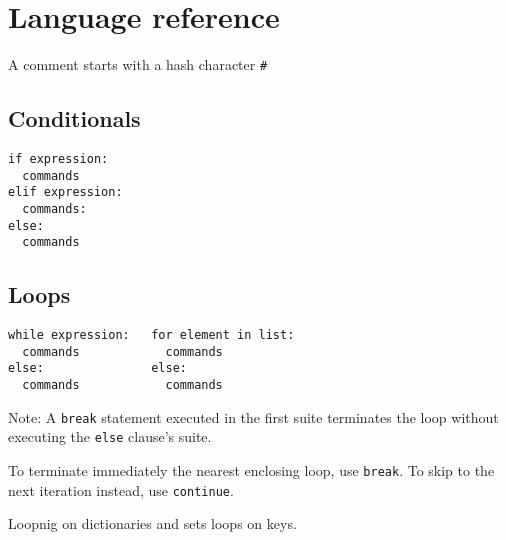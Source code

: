 \section{Language reference}
A comment starts with a hash character \texttt{#
}

\subsection{Conditionals}
\begin{verbatim}
if expression:
  commands
elif expression:
  commands:
else:
  commands
\end{verbatim}

\subsection{Loops}
\begin{verbatim}
while expression:   for element in list:
  commands            commands
else:               else:
  commands            commands
\end{verbatim}

Note: A \texttt{break} statement executed in the first suite terminates 
the loop without executing the \texttt{else} clause's suite.

To terminate immediately the nearest enclosing loop, use  \texttt{break}.
To skip to the next iteration instead, use \texttt{continue}.

Loopnig on dictionaries and sets loops on keys.
